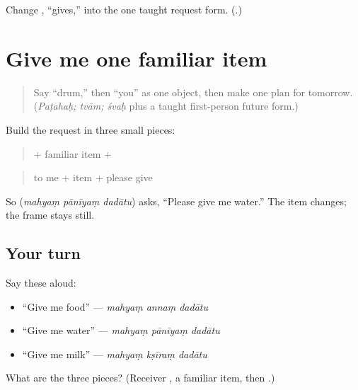 \begin{tcolorbox}[breakable,colback=teal!4,colframe=teal!35!black,title={Before you move on}]
Change \textbf{}, “gives,” into the one taught request form. (\textbf{}.)
\end{tcolorbox}
\section[(give me a familiar item)]{Give me one familiar item}

\label{lesson:SA-C265-give-me-an-item}



\begin{quote}
Say “drum,” then “you” as one object, then make one plan for tomorrow. (\emph{Paṭahaḥ; tvām; śvaḥ} plus a taught first-person future form.)
\end{quote}

\begin{grammarlens}[title={Grammar Lens: receiver, item, request}]
Build the request in three small pieces:

\begin{quote}
\textbf{} + familiar item + \textbf{}
\end{quote}

\begin{quote}
to me + item + please give
\end{quote}

So \textbf{  } (\emph{mahyaṃ pānīyaṃ dadātu}) asks, “Please give me water.” The item changes; the frame stays still.
\end{grammarlens}

\subsection*{Your turn}
Say these aloud:

\begin{itemize}
\raggedright
  \item “Give me food” — \emph{mahyaṃ annaṃ dadātu}
  \item “Give me water” — \emph{mahyaṃ pānīyaṃ dadātu}
  \item “Give me milk” — \emph{mahyaṃ kṣīraṃ dadātu}
\end{itemize}

\begin{tcolorbox}[breakable,colback=teal!4,colframe=teal!35!black,title={Before you move on}]
What are the three pieces? (Receiver \textbf{}, a familiar item, then \textbf{}.)
\end{tcolorbox}
